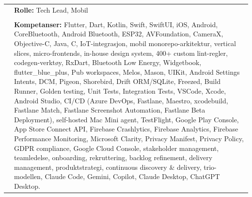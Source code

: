 \documentclass[a4paper,10pt]{article}
\begin{document}
\begin{longtable}{@{}p{4cm}p{11cm}@{}}
& \textbf{Rolle:} Tech Lead, Mobil \\
& \\
& \textbf{Kompetanser:} Flutter, Dart, Kotlin, Swift, SwiftUI, iOS, Android, CoreBluetooth, Android Bluetooth, ESP32, AVFoundation, CameraX, Objective-C, Java, C, IoT-integrasjon, mobil monorepo-arkitektur, vertical slices, micro-frontends, in-house design system, 400+ custom lint-regler, codegen-verktøy, RxDart, Bluetooth Low Energy, Widgetbook, flutter\_blue\_plus, Pub workspaces, Melos, Mason, UIKit, Android Settings Intents, DCM, Pigeon, Shorebird, Drift ORM/SQLite, Freezed, Build Runner, Golden testing, Unit Tests, Integration Tests, VSCode, Xcode, Android Studio, CI/CD (Azure DevOps, Fastlane, Maestro, xcodebuild, Fastlane Match, Fastlane Screenshot Automation, Fastlane Beta Deployment), self-hosted Mac Mini agent, TestFlight, Google Play Console, App Store Connect API, Firebase Crashlytics, Firebase Analytics, Firebase Performance Monitoring, Microsoft Clarity, Privacy Manifest, Privacy Policy, GDPR compliance, Google Cloud Console, stakeholder management, teamledelse, onboarding, rekruttering, backlog refinement, delivery management, produktstrategi, continuous discovery \& delivery, trio-modellen, Claude Code, Gemini, Copilot, Claude Desktop, ChatGPT Desktop. \\
\end{longtable}

\vspace{2em}
\end{document}
